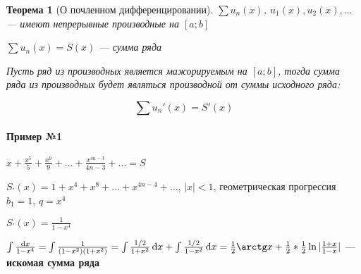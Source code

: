 \documentclass{article}
\newcommand*\diff{\mathop{}\!\mathrm{d}}
\newtheorem{theorem}{Теорема}
\begin{document}
\begin{theorem}[О почленном дифференцировании]

$\sum u_{n} (x)$, $u_1 (x), u_2(x), \dots$ — имеют непрерывные производные на $[a; b]$

$\sum u_n (x) = S(x)$ — сумма ряда

Пусть ряд из производных является мажорируемым на $[a; b]$, тогда сумма ряда из производных будет являться производной от суммы исходного ряда:

$$
\sum u_{n}'(x) = S'(x)
$$

\end{theorem}

\paragraph{Пример №1}

$x + \frac{x^{5}}{5} + \frac{x^{9}}{9} + \dots + \frac{x^{4 n - 3}}{4 n - 3} + \dots = S$

$S_{'}(x) = 1 + x^{4} + x^{8} + \dots + x^{4 n - 4} + \dots$, $|x| < 1$, геометрическая прогрессия $b_{1} = 1$, $q = x^4$

$S_{'}(x) = \frac{1}{1 - x^{4}}$

$\int \frac{\diff x}{1 - x^{4}} = \int \frac{1}{(1 - x^2) (1 + x^2)} = \int \frac{1 / 2}{1 + x^2} \diff x + \int \frac{1 / 2}{1 - x^2} \diff x = \frac{1}{2} \arctg x + \frac{1}{2} * \frac{1}{2} \ln | \frac{1 + x}{1 - x} |$ — \textbf{искомая сумма ряда}
\end{document}
